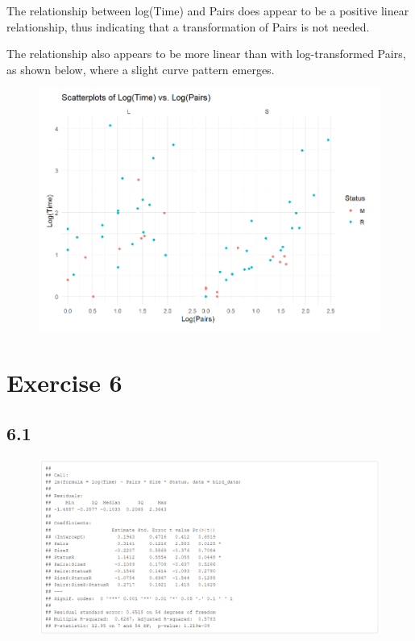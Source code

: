 \documentclass{article}
\begin{document}
The relationship between log(Time) and Pairs does appear to be a positive linear relationship, thus indicating that a transformation of Pairs is not needed.

The relationship also appears to be more linear than with log-transformed Pairs, as shown below, where a slight curve pattern emerges.

\begin{figure}
    \includegraphics[width=\linewidth]{graphs/logtime-logpairs.png}
\end{figure}


\section{Exercise 6}

\subsection*{6.1}


\begin{figure}
    \includegraphics[width=\linewidth]{tables/log-time.png}
\end{figure}
\end{document}
